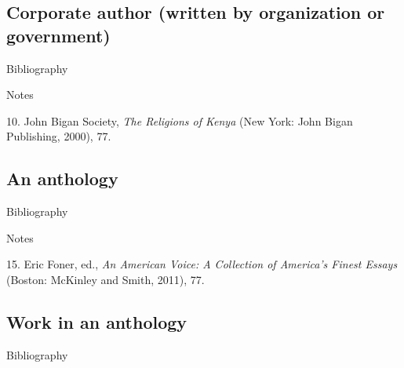 \subsection{Corporate author (written by organization or government)}

\begin{singlespace}
\begin{center}{Bibliography}\end{center} \noindent{}
\end{singlespace}

\begin{center}{Notes}\end{center} 
\begin{singlespace}
\noindent\hspace{1.2cm}10. John Bigan Society,
\emph{The Religions of Kenya} (New York: John Bigan Publishing, 2000), 77.
\end{singlespace}

\subsection{An anthology} \begin{center}{Bibliography}\end{center}

\begin{singlespace}
\noindent{}
\end{singlespace}

\begin{center}{Notes}\end{center} 

\begin{singlespace}
\noindent\hspace{1.2cm}15. Eric Foner, ed.,
\emph{An American Voice: A Collection of America's Finest Essays} (Boston:
McKinley and Smith, 2011), 77.
\end{singlespace}


\subsection{Work in an anthology}

\begin{singlespace}
\begin{center}{Bibliography}\end{center} \noindent{}
\end{singlespace}


